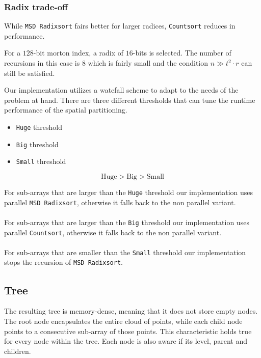 \documentclass{juliacon}
\begin{document}
\subsubsection{Radix trade-off}
While \verb|MSD Radixsort| fairs better for larger radices, \verb|Countsort| reduces in
performance.

\begin{example}
  For a $128$-bit morton index, a radix of $16$-bits is selected.
  The number of recursions in this case is $8$ which is fairly small and the condition
  $n\gg t^2\cdot r$ can still be satisfied.
\end{example}

Our implementation utilizes a watefall scheme to adapt to the needs of the problem at
hand. There are three different thresholds that can tune the runtime performance of the
spatial partitioning.

\begin{itemize}
  \item \verb|Huge| threshold
  \item \verb|Big| threshold
  \item \verb|Small| threshold
\end{itemize}

$$ \textrm{Huge} > \textrm{Big} > \textrm{Small} $$

For sub-arrays that are larger than the \verb|Huge| threshold our implementation
uses parallel \verb|MSD Radixsort|, otherwise it falls back to the non parallel variant.
\\\\
For sub-arrays that are larger than the \verb|Big| threshold our implementation uses
parallel \verb|Countsort|, otherwise it falls back to the non parallel variant.
\\\\
For sub-arrays that are smaller than the \verb|Small| threshold our implementation
stops the recursion of \verb|MSD Radixsort|.


\subsection{Tree}
The resulting tree is memory-dense, meaning that it does not store empty nodes.
The root node encapsulates the entire cloud of points, while each child node points to
a consecutive sub-array of those points. This characteristic holds true for every node
within the tree. Each node is also aware if its level, parent and children.
\end{document}
